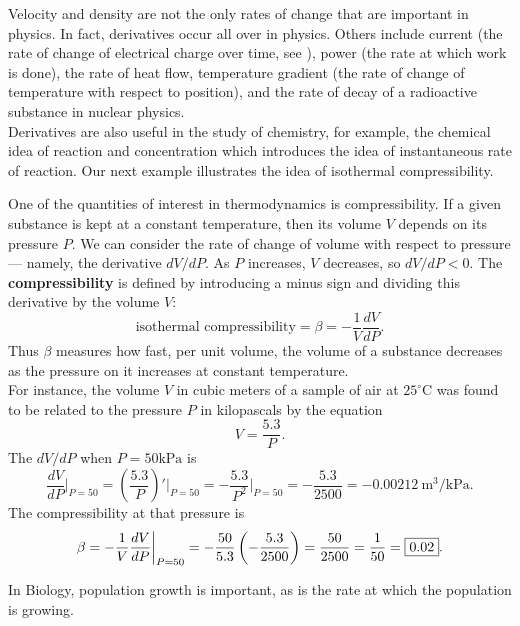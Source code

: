 \documentclass{book}
\begin{document}
Velocity and density are not the only rates of change that are important in physics. In fact, derivatives occur all over in physics. Others include current (the rate of change of electrical charge over time, see ), power (the rate at which work is done), the rate of heat flow, temperature gradient (the rate of change of temperature with respect to position), and the rate of decay of a radioactive substance in nuclear physics.\\

Derivatives are also useful in the study of chemistry,  for example, the chemical idea of reaction and  concentration which introduces the idea of instantaneous rate of reaction. Our next example illustrates the idea of isothermal compressibility.

\begin{Exam} One of the quantities of interest in thermodynamics is compressibility. If a given substance is kept at a constant temperature, then its volume $V$ depends on its pressure $P$. We can consider the rate of change of volume with respect to pressure--- namely, the derivative $dV/dP$. As $P$ increases, $V$ decreases, so $dV/dP < 0$. The \textbf{compressibility} is defined by introducing a minus sign and dividing this derivative by the volume $V$:
\[\text{isothermal compressibility} = \beta = -\dfrac{1}{V}\dfrac{dV}{dP}.\] Thus $\beta$ measures how fast, per unit volume, the volume of a substance decreases as the pressure on it increases at constant temperature.\\ 

For instance, the volume $V$ in cubic meters of a sample of air at $25^\circ$C was found to be related to the pressure $P$ in kilopascals by the equation 
\[V = \dfrac{5.3}{P}.\] The $dV/dP$ when $P = 50 \text{kPa}$ is \[\dfrac{dV}{dP}\bigg\vert_{P=50} = \left(\dfrac{5.3}{P}\right)'\bigg\vert_{P=50}= -\dfrac{5.3}{P^2}\bigg\vert_{P=50} = -\dfrac{5.3}{2500} = -0.00212\ \text{m}^3/\text{kPa}.\] The compressibility at that pressure is 
\[\beta = -\dfrac{1}{V}\dfrac{dV}{dP}\bigg\vert_{P=50} = -\dfrac{50}{5.3}\left(-\dfrac{5.3}{2500}\right) = \dfrac{50}{2500} = \dfrac{1}{50} = \fbox{$0.02$}. \]
\end{Exam}\vs

In Biology, population growth is important, as is the rate at which the population is growing.
\end{document}
